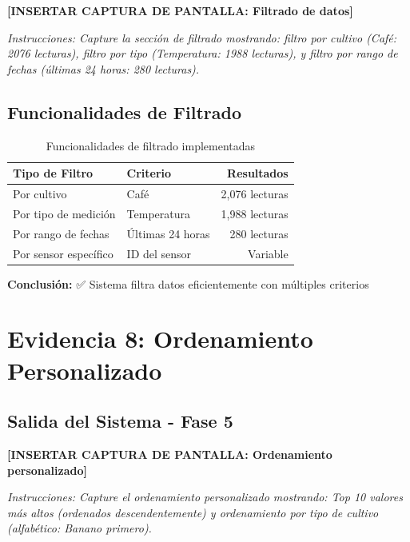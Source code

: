 \documentclass[12pt,a4paper]{article}
\begin{document}
\begin{tcolorbox}[colback=blue!5,colframe=blue!75!black,title=\textbf{FASE 4: FILTRADO DE DATOS}]
\vspace{0.5cm}
\textbf{[INSERTAR CAPTURA DE PANTALLA: Filtrado de datos]}

\textit{Instrucciones: Capture la sección de filtrado mostrando: filtro por cultivo (Café: 2076 lecturas), filtro por tipo (Temperatura: 1988 lecturas), y filtro por rango de fechas (últimas 24 horas: 280 lecturas).}
\vspace{0.5cm}
\end{tcolorbox}

\subsection{Funcionalidades de Filtrado}

\begin{table}[h]
\centering
\begin{tabular}{|l|l|r|}
\hline
\rowcolor{evidenceblue!20}
\textbf{Tipo de Filtro} & \textbf{Criterio} & \textbf{Resultados} \\
\hline
Por cultivo & Café & 2,076 lecturas \\
Por tipo de medición & Temperatura & 1,988 lecturas \\
Por rango de fechas & Últimas 24 horas & 280 lecturas \\
Por sensor específico & ID del sensor & Variable \\
\hline
\end{tabular}
\caption{Funcionalidades de filtrado implementadas}
\label{tab:filtrado}
\end{table}

\textbf{Conclusión:} ✅ Sistema filtra datos eficientemente con múltiples criterios


\section{Evidencia 8: Ordenamiento Personalizado}

\subsection{Salida del Sistema - Fase 5}

\begin{tcolorbox}[colback=blue!5,colframe=blue!75!black,title=\textbf{FASE 5: ORDENAMIENTO PERSONALIZADO}]
\vspace{0.5cm}
\textbf{[INSERTAR CAPTURA DE PANTALLA: Ordenamiento personalizado]}

\textit{Instrucciones: Capture el ordenamiento personalizado mostrando: Top 10 valores más altos (ordenados descendentemente) y ordenamiento por tipo de cultivo (alfabético: Banano primero).}
\vspace{0.5cm}
\end{tcolorbox}
\end{document}

